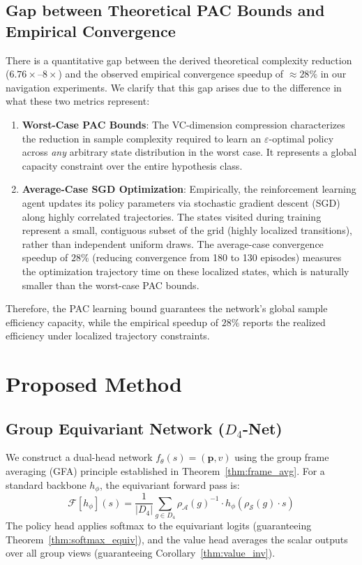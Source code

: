 \documentclass{article}
\begin{document}
\subsection{Gap between Theoretical PAC Bounds and Empirical Convergence}
There is a quantitative gap between the derived theoretical complexity reduction ($6.76\times$--$8\times$) and the observed empirical convergence speedup of $\approx 28\%$ in our navigation experiments. We clarify that this gap arises due to the difference in what these two metrics represent:
\begin{enumerate}
    \item \textbf{Worst-Case PAC Bounds}: The VC-dimension compression characterizes the reduction in sample complexity required to learn an $\varepsilon$-optimal policy across \emph{any} arbitrary state distribution in the worst case. It represents a global capacity constraint over the entire hypothesis class.
    \item \textbf{Average-Case SGD Optimization}: Empirically, the reinforcement learning agent updates its policy parameters via stochastic gradient descent (SGD) along highly correlated trajectories. The states visited during training represent a small, contiguous subset of the grid (highly localized transitions), rather than independent uniform draws. The average-case convergence speedup of $28\%$ (reducing convergence from 180 to 130 episodes) measures the optimization trajectory time on these localized states, which is naturally smaller than the worst-case PAC bounds.
\end{enumerate}
Therefore, the PAC learning bound guarantees the network's global sample efficiency capacity, while the empirical speedup of $28\%$ reports the realized efficiency under localized trajectory constraints.

\section{Proposed Method}

\subsection{Group Equivariant Network ($D_4$-Net)}
We construct a dual-head network $f_\theta(s) = (\mathbf{p}, v)$ using the group frame averaging (GFA) principle established in Theorem~\ref{thm:frame_avg}. For a standard backbone $h_\phi$, the equivariant forward pass is:
\begin{equation}
    \mathcal{F}[h_\phi](s) = \frac{1}{|D_4|} \sum_{g \in D_4} \rho_\mathcal{A}(g)^{-1} \cdot h_\phi\!\left(\rho_\mathcal{S}(g) \cdot s\right)
\end{equation}
The policy head applies softmax to the equivariant logits (guaranteeing Theorem~\ref{thm:softmax_equiv}), and the value head averages the scalar outputs over all group views (guaranteeing Corollary~\ref{thm:value_inv}).
\end{document}
